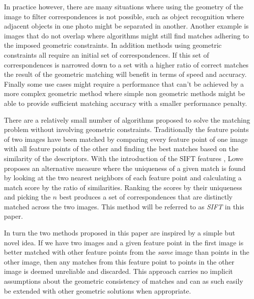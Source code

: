 \documentclass[conference]{IEEEtran}
\begin{document}

In practice however, there are many situations where using the geometry 
of the image to filter correspondences is not possible, such as object 
recognition where adjacent objects in one photo might be separated in 
another. Another example is images that do not overlap where algorithms 
might still find matches adhering to the imposed geometric constraints.
In addition methods using geometric constraints all require an initial 
set of correspondences. If this set of correspondences is narrowed down 
to a set with a higher ratio of correct matches the result of the 
geometric matching will benefit in terms of speed and accuracy. Finally 
some use cases might require a performance that can't be achieved by a 
more complex geometric method where simple non geometric methods might 
be able to provide sufficient matching accuracy with a smaller 
performance penalty.

There are a relatively small number of algorithms proposed to solve the 
matching problem without involving geometric constraints. Traditionally 
the feature points of two images have been matched by comparing every 
feature point of one image with all feature points of the other and 
finding the best matches based on the similarity of the descriptors.  
With the introduction of the SIFT features \cite{lowe2004sift}, Lowe 
proposes an alternative measure where the uniqueness of a given match is 
found by looking at the two nearest neighbors of each feature point and 
calculating a match score by the ratio of similarities. Ranking the 
scores by their uniqueness and picking the $n$ best produces a set of 
correspondences that are distinctly matched across the two images. This 
method will be referred to as \emph{SIFT} in this paper.

In turn the two methods proposed in this paper are inspired by a simple 
but novel idea. If we have two images and a given feature point in the 
first image is better matched with other feature points from the 
\emph{same} image than points in the other image, then any matches from 
this feature point to points in the other image is deemed unreliable and 
discarded.  This approach carries no implicit assumptions about the 
geometric consistency of matches and can as such easily be extended with 
other geometric solutions when appropriate.
\end{document}
